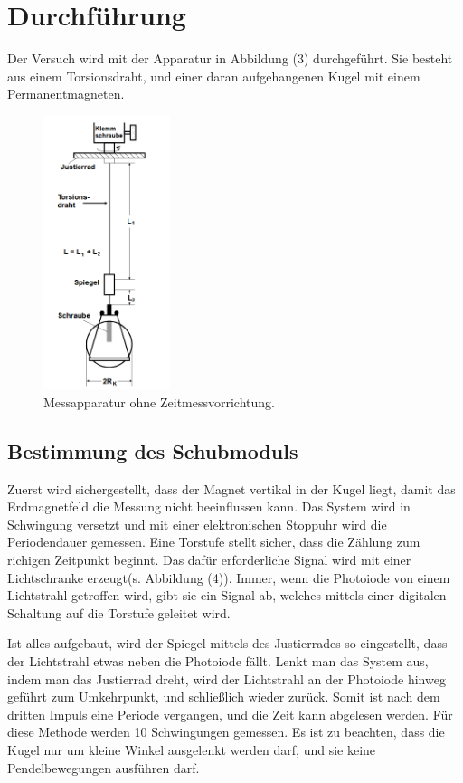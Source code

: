 \section{Durchführung}
\label{sec:Durchführung}

Der Versuch wird mit der Apparatur in Abbildung (3) durchgeführt.
Sie besteht aus einem Torsionsdraht, und einer daran aufgehangenen Kugel mit einem Permanentmagneten.

\begin{figure}[H]
 \centering
  \includegraphics[height=8cm]{Screenshot (10).png}
  \caption{Messapparatur ohne Zeitmessvorrichtung.\cite{kent}}
  \label{fig:drill}
\end{figure}


\subsection{Bestimmung des Schubmoduls}
Zuerst wird sichergestellt, dass der Magnet vertikal in der Kugel liegt, damit das Erdmagnetfeld die Messung nicht beeinflussen kann.
Das System wird in Schwingung versetzt und mit einer elektronischen Stoppuhr wird die Periodendauer gemessen.
Eine Torstufe stellt sicher, dass die Zählung zum richigen Zeitpunkt beginnt.
Das dafür erforderliche Signal wird mit einer Lichtschranke erzeugt(s. Abbildung (4)).
Immer, wenn die Photoiode von einem Lichtstrahl getroffen wird, gibt sie ein Signal ab, welches mittels einer digitalen Schaltung auf die Torstufe geleitet wird.

\noindent Ist alles aufgebaut, wird der Spiegel mittels des Justierrades so eingestellt, dass der Lichtstrahl etwas neben die Photoiode fällt.
Lenkt man das System aus, indem man das Justierrad dreht, wird der Lichtstrahl an der Photoiode hinweg geführt zum Umkehrpunkt, und schließlich wieder zurück.
Somit ist nach dem dritten Impuls eine Periode vergangen, und die Zeit kann abgelesen werden.
Für diese Methode werden 10 Schwingungen gemessen. Es ist zu beachten, dass die Kugel nur um kleine Winkel ausgelenkt werden darf, und sie keine Pendelbewegungen ausführen darf.


